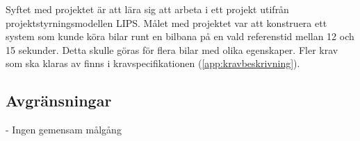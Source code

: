 Syftet med projektet är att lära sig att arbeta i ett projekt utifrån
projektstyrningsmodellen LIPS. Målet med projektet var att konstruera ett system
som kunde köra bilar runt en bilbana på en vald referenstid mellan 12 och 15
sekunder. Detta skulle göras för flera bilar med olika egenskaper. Fler krav som
ska klaras av finns i kravspecifikationen (\ref{app:kravbeskrivning}).

\subsection{Avgränsningar}

- Ingen gemensam målgång
